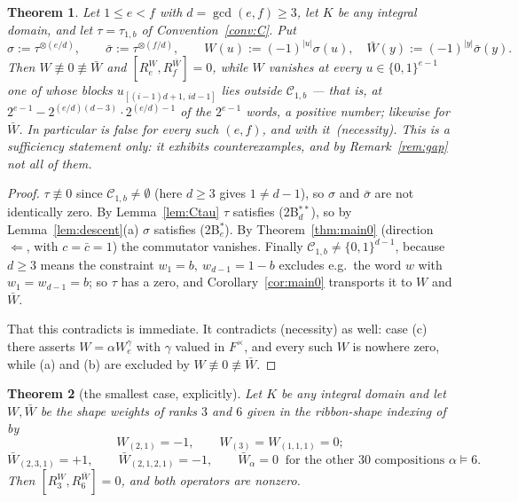 \documentclass[11pt]{article}
\newtheorem{theorem}{Theorem}[section]
\theoremstyle{definition}
\theoremstyle{remark}
\newcommand{\Cset}{\mathcal{C}}
\begin{document}
\begin{theorem}\label{thm:counter}
Let $1\le e<f$ with $d=\gcd(e,f)\ge3$, let $K$ be any integral domain, and let
$\tau=\tau_{1,b}$ of Convention~\ref{conv:C}.  Put
\[
   \sigma := \tau^{\otimes(e/d)},\qquad \bar\sigma := \tau^{\otimes(f/d)},\qquad
   W(u):=(-1)^{|u|}\sigma(u),\quad \bar W(y):=(-1)^{|y|}\bar\sigma(y).
\]
Then $W\not\equiv0\not\equiv\bar W$ and $[R_e^{W},R_f^{\bar W}]=0$, while $W$ vanishes at
every $u\in\{0,1\}^{e-1}$ one of whose blocks $u_{[(i-1)d+1,\,id-1]}$ lies outside
$\Cset_{1,b}$ --- that is, at $2^{e-1}-2^{(e/d)(d-3)}\cdot 2^{(e/d)-1}$ of the $2^{e-1}$
words, a positive number; likewise for $\bar W$.  In
particular \cite[Lemma 8.2]{Q149} is false for every such $(e,f)$, and with it
\cite[Theorem 5.2]{Q149}\,(necessity).  This is a sufficiency statement only: it
exhibits counterexamples, and by Remark~\ref{rem:gap} not all of them.
\end{theorem}

\begin{proof}
$\tau\not\equiv0$ since $\Cset_{1,b}\ne\emptyset$ (here $d\ge3$ gives $1\ne d-1$), so
$\sigma$ and $\bar\sigma$ are not identically zero.  By Lemma~\ref{lem:Ctau} $\tau$ satisfies
(2B$^{**}_d$), so by Lemma~\ref{lem:descent}(a) $\sigma$ satisfies (2B$^{*}_e$).  By
Theorem~\ref{thm:main0} (direction $\Leftarrow$, with $c=\bar c=1$) the commutator vanishes.
Finally $\Cset_{1,b}\ne\{0,1\}^{d-1}$, because $d\ge3$ means the constraint
$w_1=b,\ w_{d-1}=1-b$ excludes e.g.\ the word $w$ with $w_1=w_{d-1}=b$; so $\tau$ has a
zero, and Corollary~\ref{cor:main0} transports it to $W$ and $\bar W$.

That this contradicts \cite[Lemma 8.2]{Q149} is immediate.  It contradicts
\cite[Thm.~5.2]{Q149}(necessity) as well: case (c) there asserts
$W=\alpha W_e^{\gamma}$ with $\gamma$ valued in $F^\times$, and every such $W$ is nowhere
zero, while (a) and (b) are excluded by $W\not\equiv0\not\equiv\bar W$.
\end{proof}

\begin{theorem}[the smallest case, explicitly]\label{thm:counter36}
Let $K$ be any integral domain and let $W,\bar W$ be the shape weights of ranks $3$ and $6$
given in the ribbon-shape indexing of \cite[Lemma 1.3]{Q149} by
\[
  W_{(2,1)}=-1,\qquad W_{(3)}=W_{(1,1,1)}=0;
\]
\[
  \bar W_{(2,3,1)}=+1,\qquad \bar W_{(2,1,2,1)}=-1,\qquad
  \bar W_{\alpha}=0\ \text{ for the other } 30 \text{ compositions } \alpha\models6 .
\]
Then $[R_3^{W},R_6^{\bar W}]=0$, and both operators are nonzero.
\end{theorem}
\end{document}
